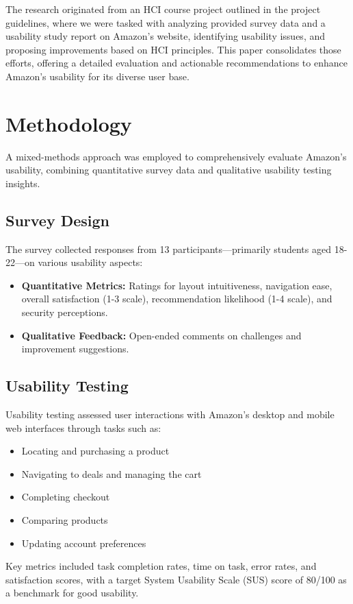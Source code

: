 \documentclass[conference]{IEEEtran}
\begin{document}
The research originated from an HCI course project outlined in the project guidelines, where we were tasked with analyzing provided survey data and a usability study report on Amazon's website, identifying usability issues, and proposing improvements based on HCI principles. This paper consolidates those efforts, offering a detailed evaluation and actionable recommendations to enhance Amazon's usability for its diverse user base.

\section{Methodology}
A mixed-methods approach was employed to comprehensively evaluate Amazon's usability, combining quantitative survey data and qualitative usability testing insights.

\subsection{Survey Design}
The survey collected responses from 13 participants—primarily students aged 18-22—on various usability aspects:
\begin{itemize}
    \item \textbf{Quantitative Metrics:} Ratings for layout intuitiveness, navigation ease, overall satisfaction (1-3 scale), recommendation likelihood (1-4 scale), and security perceptions.
    \item \textbf{Qualitative Feedback:} Open-ended comments on challenges and improvement suggestions.
\end{itemize}

\subsection{Usability Testing}
Usability testing assessed user interactions with Amazon's desktop and mobile web interfaces through tasks such as:
\begin{itemize}
    \item Locating and purchasing a product
    \item Navigating to deals and managing the cart
    \item Completing checkout
    \item Comparing products
    \item Updating account preferences
\end{itemize}

Key metrics included task completion rates, time on task, error rates, and satisfaction scores, with a target System Usability Scale (SUS) score of 80/100 as a benchmark for good usability.
\end{document}
